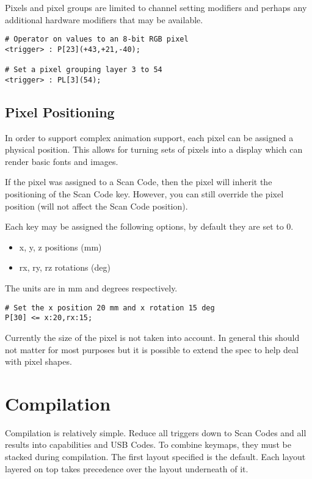 \documentclass{kiibohd-template}
\begin{document}
Pixels and pixel groups are limited to channel setting modifiers and perhaps any additional hardware modifiers that may be available.

\begin{lstlisting}
# Operator on values to an 8-bit RGB pixel
<trigger> : P[23](+43,+21,-40);

# Set a pixel grouping layer 3 to 54
<trigger> : PL[3](54);
\end{lstlisting}


\section{Pixel Positioning}

In order to support complex animation support, each pixel can be assigned a physical position.
This allows for turning sets of pixels into a display which can render basic fonts and images.

If the pixel was assigned to a Scan Code, then the pixel will inherit the positioning of the Scan Code key.
However, you can still override the pixel position (will not affect the Scan Code position).

Each key may be assigned the following options, by default they are set to 0.

\begin{itemize}
\item x, y, z positions (mm)
\item rx, ry, rz rotations (deg)
\end{itemize}

The units are in mm and degrees respectively.

\begin{lstlisting}
# Set the x position 20 mm and x rotation 15 deg
P[30] <= x:20,rx:15;
\end{lstlisting}

Currently the size of the pixel is not taken into account.
In general this should not matter for most purposes but it is possible to extend the spec to help deal with pixel shapes.


\chapter{Compilation}

Compilation is relatively simple.
Reduce all triggers down to Scan Codes and all results into capabilities and USB Codes.
To combine keymaps, they must be stacked during compilation.
The first layout specified is the default.
Each layout layered on top takes precedence over the layout underneath of it.
\end{document}
